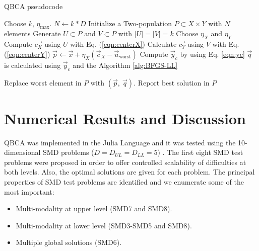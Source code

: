 \documentclass[conference]{IEEEtran}
\theoremstyle{definition}
\begin{document}
\begin{algorithm}[htbp]
    \caption{QBCA pseudocode}
    \label{alg:QBCA}
    \begin{algorithmic}[1]
        \STATE Choose $k$, $\eta_{\max}$.
        \STATE $N \gets k * D$
        \STATE Initialize a Two-population $P\subset X\times Y$ with $N$ elements
                \STATE Generate $U \subset P$ and $V \subset P$ with $|U| = |V| = k$
                \STATE Choose $\eta_{X}$ and $\eta_{Y}$
                \STATE Compute $\vec{c_X}$ using $U$ with Eq. (\ref{eqn:centerX})
                \STATE Calculate $\vec{c_Y}$ using $V$ with Eq. (\ref{eqn:centerY})
                \STATE $ \vec{p} \gets \vec{x} + \eta_{X} (\vec{c}_X - \vec{u}_{\text{worst}})$
                \STATE Compute $ \vec{y}_c $ by using Eq. \ref{eqn:yc}
                \STATE $ \vec{q} $ is calculated using $\vec{y}_c$ and the Algorithm \ref{alg:BFGS-LL}
                
                    \STATE Replace worst element in $P$ with $(\vec{p},\ \vec{q})$.
                \ENDIF
            \ENDFOR
        \ENDWHILE
        \STATE Report best solution in $P$
    \end{algorithmic}
\end{algorithm}

\section{Numerical Results and Discussion} %
\label{sec:numerical_result}

QBCA was implemented in the Julia Language \cite{bezanson2017julia} and it was
tested using the 10-dimensional SMD problems ($D = D_{UL} = D_{LL} = 5$)
\cite{sinha2014test,sinha2013efficient}. The first eight SMD test problems were
proposed in order to offer controlled scalability of difficulties at both levels.
Also, the optimal solutions are given for each problem. The principal properties
of SMD test problems are identified and we enumerate some of the most important:

\begin{itemize}
    \item Multi-modality at upper level (SMD7 and SMD8).
    \item Multi-modality at lower level (SMD3-SMD5 and SMD8).
    \item Multiple global solutions (SMD6).
\end{itemize}
\end{document}
